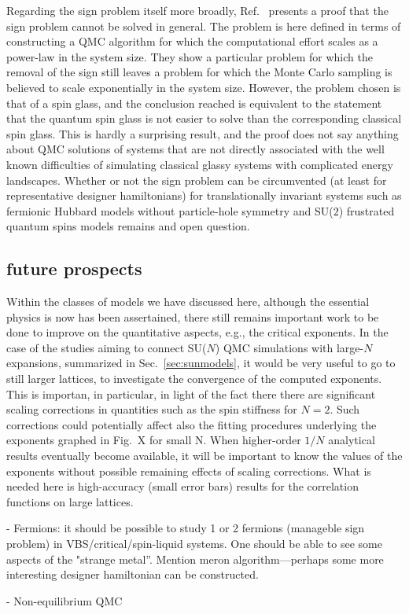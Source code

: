 \documentclass[range]{ar2e}
\begin{document}
Regarding the sign problem itself more broadly, Ref.~\cite{Troyer05} presents a proof that the sign problem cannot be solved in general. 
The problem is here defined in terms of constructing a QMC algorithm for which the computational effort scales as a power-law in the system
size. They show a particular problem for which the removal of the sign still leaves a problem for which the Monte Carlo sampling is believed 
to scale exponentially in the system size. However, the problem chosen is that of a spin glass, and the conclusion reached is equivalent to
the statement that the quantum spin glass is not easier to solve than the corresponding classical spin glass. This is hardly a surprising result, 
and the proof does not say anything about QMC solutions of systems that are not directly associated with the well known difficulties of simulating 
classical glassy systems with complicated energy landscapes. Whether or not the sign problem can be circumvented (at least for representative 
designer hamiltonians) for translationally invariant systems such as fermionic Hubbard models without particle-hole symmetry and SU($2$) frustrated 
quantum spins models remains and open question.

\subsection{future prospects}

Within the classes of models we have discussed here, although the essential physics is now has been assertained, there still remains
important work to be done to improve on the quantitative aspects, e.g., the critical exponents. In the case of the studies aiming to connect
SU($N$) QMC simulations with large-$N$ expansions, summarized in Sec.~\ref{sec:sunmodels}, it would be very useful to go to still larger lattices, 
to investigate the convergence of the computed exponents. This is importan, in particular, in light of the fact there there are significant scaling 
corrections in quantities such as the spin stiffness for $N=2$. Such corrections could potentially affect also the fitting procedures underlying 
the exponents graphed in Fig.~X for small N. When higher-order $1/N$ analytical results eventually become available, it will be important to know 
the values of the exponents without possible remaining effects of scaling corrections. What is needed here is high-accuracy (small error bars) 
results for the correlation functions on large lattices.

- Fermions: it should be possible to study 1 or 2 fermions (manageble sign problem) in 
VBS/critical/spin-liquid systems. One should be able to see some aspects of the "strange metal''.
Mention meron algorithm---perhaps some more interesting designer hamiltonian can be constructed.

- Non-equilibrium QMC




\end{document}
